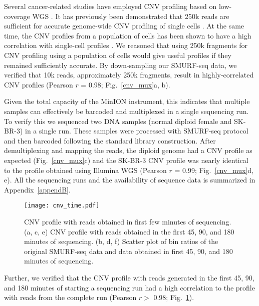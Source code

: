 Several cancer-related studies have employed CNV profiling based on
low-coverage WGS \citep{macintyre2018copy,kader2016copy}.  It has
previously been demonstrated that 250k reads are sufficient for accurate
genome-wide CNV profiling of single cells \citep{baslan2015optimizing}.
At the same time, the CNV profiles from a population of cells has been
shown to have a high correlation with single-cell profiles
\citep{navin2011tumour,baslan2015optimizing}. We reasoned that using 250k
fragments for CNV profiling using a population of cells would give
useful profiles if they remained sufficiently accurate.  By
down-sampling our SMURF-seq data, we verified that 10k reads,
approximately 250k fragments, result in highly-correlated CNV profiles
(Pearson $r$ = 0.98; Fig.~\ref{cnv_mux}a, b).

Given the total capacity of the MinION instrument, this indicates that
multiple samples can effectively be barcoded and multiplexed in a single
sequencing run.
To verify this we sequenced two DNA samples (normal diploid female and
SK-BR-3) in a single run.  These samples were processed with SMURF-seq
protocol and then barcoded following the standard library construction.
After demultiplexing and mapping the reads, the diploid genome had a CNV
profile as expected (Fig.~\ref{cnv_mux}c) and the SK-BR-3 CNV profile
was nearly identical to the profile obtained using Illumina WGS (Pearson
$r$ = 0.99; Fig.~\ref{cnv_mux}d, e). All the sequencing runs and the
availability of sequence data is summarized in Appendix~\ref{appendB}.

\begin{figure}[t!]
\centering
\texttt{[image: cnv\_time.pdf]}
\caption[CNV profile with reads obtained in first few minutes of
  sequencing]{
  CNV profile with reads obtained in first few minutes of sequencing.
  (a, c, e) CNV profile  with reads obtained in the first 45, 90,
  and 180 minutes of sequencing.
  (b, d, f) Scatter plot of bin ratios of the original
  SMURF-seq data and data obtained in first 45, 90, and 180
  minutes of sequencing.}
  \label{cnv_time}
\end{figure}

Further, we verified that the CNV profile with reads generated in the
first 45, 90, and 180 minutes of starting a sequencing run had a high
correlation to the profile with reads from the complete run (Pearson $r>$
0.98; Fig.~\ref{cnv_time}).

